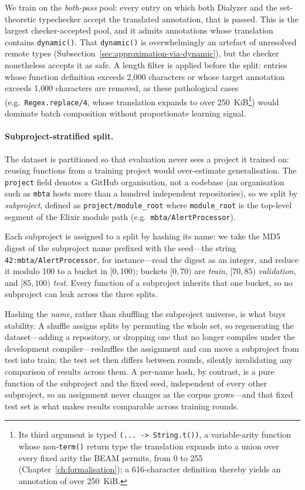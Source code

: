 We train on the \emph{both-pass} pool: every entry on which both Dialyzer and the set-theoretic typechecker accept the translated annotation, that is passed.
This is the largest checker-accepted pool, and it admits annotations whose translation contains \texttt{dynamic()}. That \texttt{dynamic()} is overwhelmingly an artefact of unresolved remote types (Subsection~\ref{sec:approximation-via-dynamic}), but the checker nonetheless accepts it as safe.
A length filter is applied before the split: entries whose function definition exceeds 2{,}000 characters or whose target annotation exceeds 1{,}000 characters are removed, as these pathological cases (e.g.\ \texttt{Regex.replace/4}, whose translation expands to over 250~KiB\footnote{Its third argument is typed \texttt{(... -> String.t())}, a variable-arity function whose non-\texttt{term()} return type the translation expands into a union over every fixed arity the BEAM permits, from 0 to 255 (Chapter~\ref{ch:formalisation}); a 616-character definition thereby yields an annotation of over 250~KiB.}) would dominate batch composition without proportionate learning signal.

\paragraph{Subproject-stratified split.}
The dataset is partitioned so that evaluation never sees a project it trained on: reusing functions from a training project would over-estimate generalisation.
The \texttt{project} field denotes a GitHub organisation, not a codebase (an organisation such as \texttt{mbta} hosts more than a hundred independent repositories), so we split by \emph{subproject}, defined as \texttt{project/module\_root} where \texttt{module\_root} is the top-level segment of the Elixir module path (e.g.\ \texttt{mbta/AlertProcessor}).

Each subproject is assigned to a split by hashing its name: we take the MD5 digest of the subproject name prefixed with the seed---the string \texttt{42:mbta/AlertProcessor}, for instance---read the digest as an integer, and reduce it modulo 100 to a bucket in $[0,100)$; buckets $[0,70)$ are \emph{train}, $[70,85)$ \emph{validation}, and $[85,100)$ \emph{test}. Every function of a subproject inherits that one bucket, so no subproject can leak across the three splits.

Hashing the \emph{name}, rather than shuffling the subproject universe, is what buys stability. A shuffle assigns splits by permuting the whole set, so regenerating the dataset---adding a repository, or dropping one that no longer compiles under the development compiler---reshuffles the assignment and can move a subproject from test into train; the test set then differs between rounds, silently invalidating any comparison of results across them. A per-name hash, by contrast, is a pure function of the subproject and the fixed seed, independent of every other subproject, so an assignment never changes as the corpus grows---and that fixed test set is what makes results comparable across training rounds.

